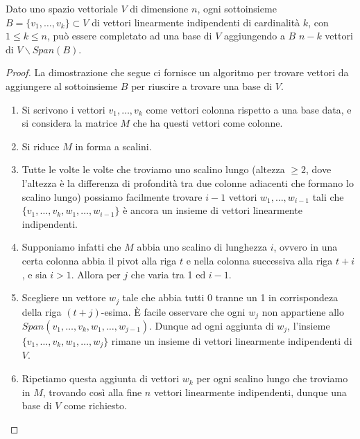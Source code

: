 \begin{theorem}[Completamento]
	Dato uno spazio vettoriale $V$ di dimensione $n$, ogni
	sottoinsieme $B = \{v_1, \dots, v_k\} \subset V$ di vettori
	linearmente indipendenti di cardinalit\`a $k$, con
	$1 \leq k \leq n$, pu\`o essere completato ad una base di $V$
	aggiungendo a $B$ $n - k$ vettori di $V \backslash Span(B)$.
	\begin{proof}
		La dimostrazione che segue ci fornisce un algoritmo per trovare
		vettori da aggiungere al sottoinsieme $B$ per riuscire a trovare
		una base di $V$.
		\begin{enumerate}
			\item Si scrivono i vettori $v_1, \dots, v_k$ come
			      vettori colonna rispetto a una base data, e si considera
			      la matrice $M$ che ha questi vettori come colonne.
			\item Si riduce $M$ in forma a scalini.
			\item Tutte le volte le volte che troviamo uno scalino lungo
			      (altezza $\geq 2$, dove l'altezza \`e la differenza di profondit\`a
			      tra due colonne adiacenti che formano lo scalino lungo) possiamo
			      facilmente trovare $i - 1$ vettori $w_1, \dots, w_{i - 1}$ tali che
			      $\{v_1, \dots, v_k, w_1, \dots, w_{i - 1}\}$ \`e ancora un
			      insieme di vettori linearmente indipendenti.
			\item Supponiamo infatti che $M$ abbia uno scalino di lunghezza $i$,
			      ovvero in una certa colonna abbia il pivot alla riga $t$ e nella
			      colonna successiva alla riga $t+i$, e sia $i > 1$. Allora
			      per $j$ che varia tra 1 ed $i - 1$.
			\item Scegliere un vettore $w_j$ tale che abbia tutti
			      0 tranne un 1 in corrispondeza della riga $(t + j)$-esima.
			      \`E facile osservare che ogni $w_j$ non appartiene
			      allo $Span(v_1, \dots, v_k, w_1, \dots, w_{j-1})$. Dunque ad
			      ogni aggiunta di $w_j$, l'insieme
			      $\{v_1, \dots, v_k, w_1, \dots, w_j\}$ rimane un insieme di
			      vettori linearmente indipendenti di $V$.
			\item Ripetiamo questa aggiunta di vettori $w_k$ per ogni scalino
			      lungo che troviamo in $M$, trovando cos\`i alla fine $n$ vettori
			      linearmente indipendenti, dunque una base di $V$ come richiesto.
		\end{enumerate}
	\end{proof}
\end{theorem}

